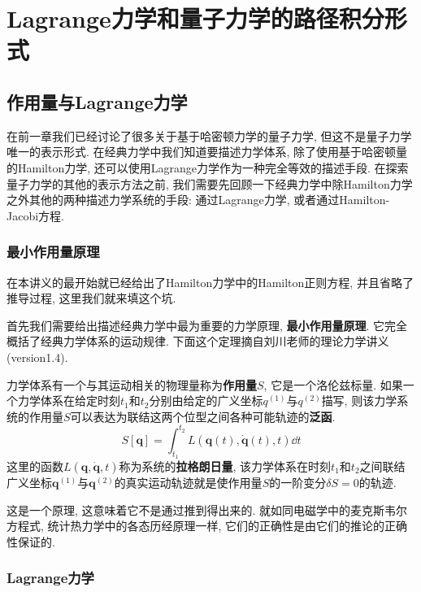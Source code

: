 \chapter{Lagrange力学和量子力学的路径积分形式}
    \section{作用量与Lagrange力学}

        在前一章我们已经讨论了很多关于基于哈密顿力学的量子力学, 但这不是量子力学唯一的表示形式. 在经典力学中我们知道要描述力学体系, 除了使用基于哈密顿量的Hamilton力学, 还可以使用Lagrange力学作为一种完全等效的描述手段. 在探索量子力学的其他的表示方法之前, 我们需要先回顾一下经典力学中除Hamilton力学之外其他的两种描述力学系统的手段: 通过Lagrange力学, 或者通过Hamilton-Jacobi方程. 

        \subsection{最小作用量原理}

        在本讲义的最开始就已经给出了Hamilton力学中的Hamilton正则方程, 并且省略了推导过程, 这里我们就来填这个坑. 

        首先我们需要给出描述经典力学中最为重要的力学原理, \textbf{最小作用量原理}. 它完全概括了经典力学体系的运动规律. 下面这个定理摘自刘川老师的理论力学讲义(version1.4). 

        \begin{law}[最小作用量原理]
            力学体系有一个与其运动相关的物理量称为\textbf{作用量}$S$, 它是一个洛伦兹标量. 如果一个力学体系在给定时刻$t_1$和$t_2$分别由给定的广义坐标$q^{(1)}$与$q^{(2)}$描写, 则该力学系统的作用量$S$可以表达为联结这两个位型之间各种可能轨迹的\textbf{泛函}. 
            \begin{equation}
                S[\bm q] = \int_{t_1}^{t_2} L( \bm q(t), \bm \dot q(t), t ) \dd t
            \end{equation}
            这里的函数$L(\bm q,\bm \dot q,t)$称为系统的\textbf{拉格朗日量}, 该力学体系在时刻$t_1$和$t_2$之间联结广义坐标$\bm q^{(1)}$与$\bm q^{(2)}$的真实运动轨迹就是使作用量$S$的一阶变分$\delta S = 0$的轨迹.
        \end{law}

        这是一个原理, 这意味着它不是通过推到得出来的. 就如同电磁学中的麦克斯韦尔方程式, 统计热力学中的各态历经原理一样, 它们的正确性是由它们的推论的正确性保证的. 

        \subsection{Lagrange力学}

